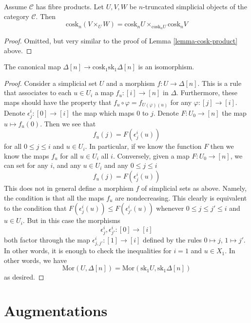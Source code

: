 \begin{lemma}
\label{lemma-cosk-fibre-product}
Assume $\mathcal{C}$ has fibre products.
Let $U, V, W$ be $n$-truncated simplicial objects of the
category $\mathcal{C}$. Then
$$
\text{cosk}_n (V \times_U W)
=
\text{cosk}_nU \times_{\text{cosk}_n U} \text{cosk}_nV
$$
\end{lemma}

\begin{proof}
Omitted, but very similar to the proof of
Lemma \ref{lemma-cosk-product} above.
\end{proof}


\begin{lemma}
\label{lemma-simplex-cosk}
The canonical map
$\Delta[n] \to \text{cosk}_1 \text{sk}_1 \Delta[n]$
is an isomorphism.
\end{lemma}

\begin{proof}
Consider a simplicial set $U$ and a morphism
$f : U \to \Delta[n]$. This is a rule that associates
to each $u \in U_i$ a map $f_u : [i] \to [n]$ in $\Delta$.
Furthermore, these maps should have the property that
$f_u \circ \varphi = f_{U(\varphi)(u)}$ for any
$\varphi : [j] \to [i]$. Denote $\epsilon^i_j : [0] \to [i]$
the map which maps $0$ to $j$. Denote $F : U_0 \to [n]$
the map $u \mapsto f_u(0)$. Then we see that
$$
f_u(j) = F(\epsilon^i_j(u))
$$
for all $0 \leq j \leq i$ and $u \in U_i$.
In particular, if we know the function $F$
then we know the maps $f_u$ for all $u\in U_i$ all $i$.
Conversely, given a map $F : U_0 \to [n]$,
we can set for any $i$, and any $u \in U_i$
and any $0 \leq j \leq i$
$$
f_u(j) = F(\epsilon^i_j(u))
$$
This does not in general define a morphism $f$ of simplicial sets
as above. Namely, the condition is that all the maps $f_u$ are
nondecreasing. This clearly is equivalent to the condition
that $F(\epsilon^i_j(u)) \leq F(\epsilon^i_{j'}(u))$
whenever $0 \leq j \leq j' \leq i$ and $u \in U_i$. But in this
case the morphisms
$$
\epsilon^i_j, \epsilon^i_{j'} : [0] \to [i]
$$
both factor through the map
$\epsilon^i_{j, j'} : [1] \to [i]$ defined by the rules
$0 \mapsto j$, $1 \mapsto j'$.
In other words, it is enough to check the inequalities for
$i = 1$ and $u \in X_1$. In other words, we have
$$
\text{Mor}(U, \Delta[n])
=
\text{Mor}(\text{sk}_1 U, \text{sk}_1 \Delta[n])
$$
as desired.
\end{proof}



\section{Augmentations}
\label{section-augmentation}

